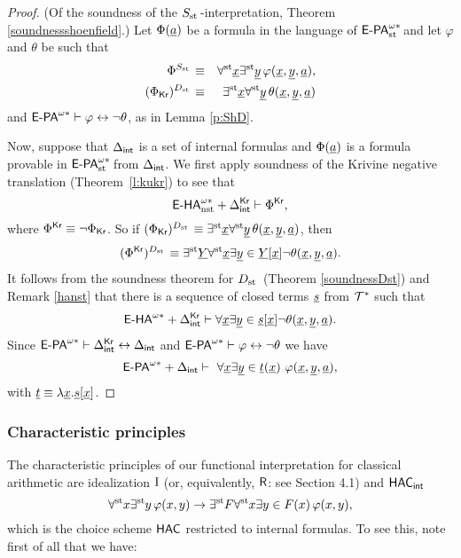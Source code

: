 \begin{proof} (Of the soundness of the $\Sh$-interpretation, Theorem \ref{soundnessshoenfield}.) Let $\Phi(\tup a)$ be a formula in the language of $\epaststar$ and let  $\varphi$ and $\theta$ be such that
\begin{eqnarray*}
\Phi^\Sh & \equiv & \forallst \tup x\existsst  \tup y \, \phi(\tup x, \tup y, \tup a), \\
(\Phi_\kr)^\D & \equiv & \existsst \tup x \forallst \tup y \, \theta(\tup x,\tup y, \tup a)
\end{eqnarray*}
and $\epastar \vdash \varphi \leftrightarrow \lnot \theta$, as in Lemma \ref{p:ShD}.

Now, suppose that $\Delta_\intern$ is a set of internal formulas and $\Phi(\tup a)$ is a formula provable in $\epaststar$ from  $\Delta_\intern$. We first apply soundness of the Krivine negative translation (Theorem~\ref{l:kukr}) to see that
\[ \ehanststar + \Delta_\intern^\kr \vdash \Phi^\kr, \]
where $\Phi^\kr \equiv \lnot \Phi_\kr$. So if $(\Phi_\kr)^\D \equiv \existsst \tup x \forallst \tup y \, \theta(\tup x,\tup y, \tup a)$, then
\[ (\Phi^\kr)^\D \equiv \existsst \tup Y \forallst \tup x \exists \tup y \in \tup Y[\tup x] \lnot \theta(\tup x, \tup y, \tup a). \]
It follows from the soundness theorem for $\D$ (Theorem \ref{soundnessDst}) and Remark \ref{hanst} that there is a sequence of closed terms $\tup s$ from $\Tstar$ such that
\[ \ehastar + \Delta_\intern^\kr \vdash \forall \tup x \exists \tup y  \in \tup s[\tup x] \lnot \theta(\tup x, \tup y, \tup a). \]
Since $\epastar \vdash \Delta_\intern^\kr \leftrightarrow \Delta_\intern$ and $\epastar \vdash \varphi \leftrightarrow \lnot \theta$ we have
\[
\epastar + \Delta_{\intern} \vdash\ \forall \tup x\exists \tup y \in \tup t(\tup x)\ \phi(\tup x,\tup y, \tup a),
\]
with $\tup t \equiv \lambda \tup x. \tup s[\tup x]$.
\end{proof}

\subsubsection*{Characteristic principles}

The characteristic principles of our functional interpretation for classical arithmetic are idealization $\I$ (or, equivalently, $\R$: see Section 4.1) and $\HAC_\intern$
\[     \forallst x \existsst y \, \varphi(x,y) \to \existsst F \forallst x \exists y \in F(x)\,  \varphi (x,y),         \]
which is the choice scheme $\HAC$ restricted to internal formulas. To see this, note first of all that we have:

